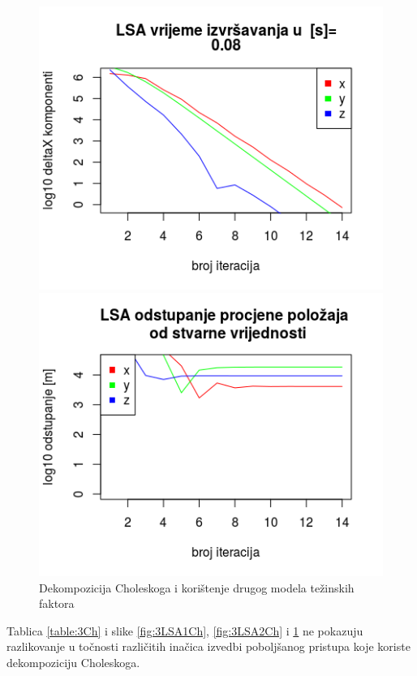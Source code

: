 \documentclass[a4paper,twoside,12pt]{memoir} %
\begin{document}
\begin{figure}[H]
	\begin{minipage}{0.48\textwidth}
		\centering
		\includegraphics[width=1\textwidth]{3LSAdelta3l10b}
		
	\end{minipage}%
	\hspace{1cm}
	\begin{minipage}{0.48\textwidth}
		
		\includegraphics[width=1\textwidth]{3LSAreal3l10b}
	\end{minipage}%
	\caption{Dekompozicija Choleskoga i korištenje drugog modela težinskih faktora}
	\label{fig:3LSA3Ch}
\end{figure}
Tablica \ref{table:3Ch} i slike \ref{fig:3LSA1Ch}, \ref{fig:3LSA2Ch} i \ref{fig:3LSA3Ch} ne pokazuju razlikovanje u točnosti različitih inačica izvedbi poboljšanog pristupa koje koriste dekompoziciju Choleskoga.
\end{document}
